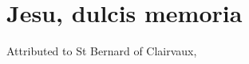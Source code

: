 \documentclass[oldfontcommands,a5paper,openany]{memoir}
\begin{document}
\autocompilegabc

\section{Jesu, dulcis memoria}


Attributed to St Bernard of Clairvaux, 
\end{document}
